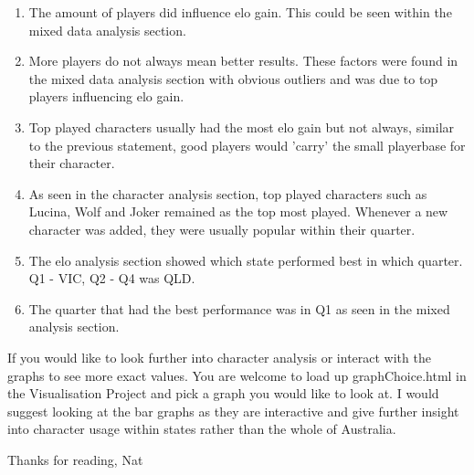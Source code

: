 \documentclass[11pt, oneside, a4paper]{article}
\begin{document}
\begin{enumerate}
    \item The amount of players did influence elo gain. This could be seen within the mixed data analysis section.
    \item More players do not always mean better results. These factors were found in the mixed data analysis section with obvious 		outliers and was due to top players influencing elo gain.
    \item Top played characters usually had the most elo gain but not always, similar to the previous statement, good players would 	'carry' the small playerbase for their character.
    \item As seen in the character analysis section, top played characters such as Lucina, Wolf and Joker remained as the top most 	played. Whenever a new character was added, they were usually popular within their quarter.
    \item The elo analysis section showed which state performed best in which quarter. Q1 - VIC, Q2 - Q4 was QLD.
    \item The quarter that had the best performance was in Q1 as seen in the mixed analysis section.
\end{enumerate}

If you would like to look further into character analysis or interact with the graphs to see more exact values. You are welcome to load up graphChoice.html in the Visualisation Project and pick a graph you would like to look at. I would suggest looking at the bar graphs as they are interactive and give further insight into character usage within states rather than the whole of Australia.

Thanks for reading, Nat
\end{document}
